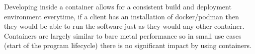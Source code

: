 \documentclass{article}
\begin{document}
Developing inside a container allows for a consistent build and deployment environment 
everytime, if a client has an installation of docker/podman then they would be able to 
run the software just as they would any other container. Containers are largely similar 
to bare metal performance so in small use cases (start of the program lifecycle) there 
is no significant impact by using containers.
\end{document}
